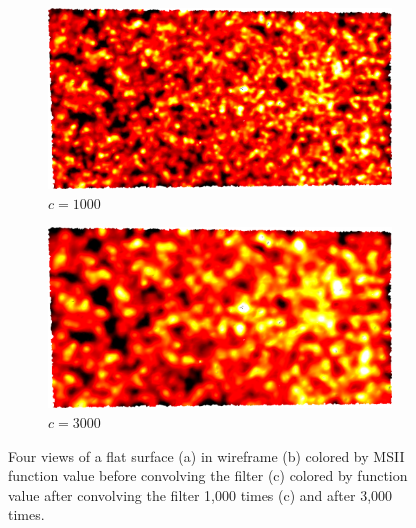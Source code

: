 \begin{figure}[ht]
	\bigskip
	\begin{subfigure}[b]{0.49\linewidth}
		\includegraphics[width=\linewidth]
		{data/acquired_meshes/ILATO_1A_SM2066-HE5-60_070214_merged_GMO_r1_n4_v256_funcvals_1000iter.png}
		\caption{$c=1000$}\label{fig:ILATO.c}
	\end{subfigure}
	\begin{subfigure}[b]{0.49\linewidth}
		\includegraphics[width=\linewidth]
		{data/acquired_meshes/ILATO_1A_SM2066-HE5-60_070214_merged_GMO_r1_n4_v256_funcvals_3000iter.png}
		\caption{$c=3000$}\label{fig:ILATO.d}
	\end{subfigure}
	\caption[Four Views of the Flat Surface from ILATO]{Four views of a flat surface (a) in wireframe (b) colored by MSII function value before convolving the filter (c) colored by function value after convolving the filter 1,000 times (c) and after 3,000 times.}
	\label{fig:ILATO}
\end{figure}
